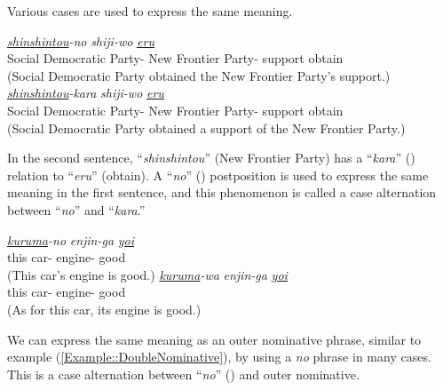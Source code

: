 \documentclass[english]{jnlp_1.4_rep}
\newcommand{\nom}{}
\newcommand{\abl}{}
\newcommand{\gen}{}
\newcommand{\TOP}{}
\begin{document}
\noindent
Various cases are used to express the same meaning.

\vspace{-3pt}
\begin{exe}
\ex
 \begin{xlist}
 \ex
   {\textit{\underline{shinshintou}-no}} {\textit{shiji-wo}} {\textit{\underline{\underline{eru}}}} \\
       {Social Democratic Party-\nom} {New Frontier Party-\gen} {support} {obtain} \\
  \trans (Social Democratic Party obtained the New Frontier Party's support.)
 \ex
   {\textit{\underline{shinshintou}-kara}} {\textit{shiji-wo}} {\textit{\underline{\underline{eru}}}} \\
       {Social Democratic Party-\nom} {New Frontier Party-\abl} {support} {obtain} \\
  \trans (Social Democratic Party obtained a support of the New Frontier Party.)
 \end{xlist}
\end{exe}
\vspace{-3pt}

In the second sentence, ``\textit{shinshintou}'' (New Frontier Party) has a
``\textit{kara}'' (\abl) relation to ``\textit{eru}'' (obtain). A
``\textit{no}'' (\gen) postposition is used to express the same meaning
in the first sentence, and this phenomenon is called a case alternation
between ``\textit{no}'' and ``\textit{kara}.''

\vspace{-3pt}
\begin{exe}
\ex
 \begin{xlist}
 \ex
   {\textit{\underline{kuruma}-no}} {\textit{enjin-ga}} {\textit{\underline{\underline{yoi}}}} \\
       {this} {car-\gen} {engine-\nom} {good} \\
  \trans (This car's engine is good.)
 \ex
   {\textit{\underline{kuruma}-wa}} {\textit{enjin-ga}} {\textit{\underline{\underline{yoi}}}} \\
       {this} {car-\TOP} {engine-\nom} {good} \\
  \trans (As for this car, its engine is good.)
 \end{xlist}
\end{exe}

We can express the same meaning as an outer nominative phrase, similar to
example (\ref{Example::DoubleNominative}), by using a \textit{no} phrase in many cases.
This is a case alternation between ``\textit{no}'' (\gen) and outer nominative.
\end{document}
